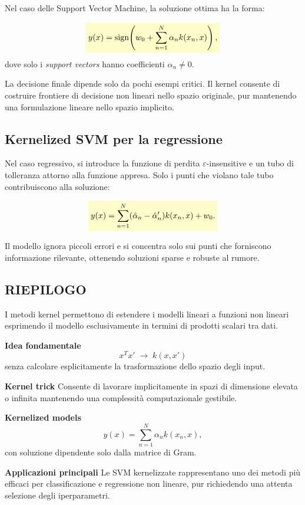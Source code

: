 \documentclass[a4paper,12pt]{report}
\newcommand{\highlight}[1]{%
\colorbox{yellow!20}{$\displaystyle #1$}%
}
\begin{document}
Nel caso delle Support Vector Machine, la soluzione ottima ha la forma:

\[
\highlight{
y(x) = \mathrm{sign}\!\left(w_0 + \sum_{n=1}^{N} \alpha_n k(x_n, x)\right),}
\]
dove solo i \emph{support vectors} hanno coefficienti $\alpha_n \neq 0$.

La decisione finale dipende solo da pochi esempi critici. Il kernel consente di costruire frontiere di decisione non lineari nello spazio originale, pur mantenendo una formulazione lineare nello spazio implicito.

\subsection{Kernelized SVM per la regressione}

Nel caso regressivo, si introduce la funzione di perdita $\varepsilon$-insensitive e un tubo di tolleranza attorno alla funzione appresa. Solo i punti che violano tale tubo contribuiscono alla soluzione:

\[
\highlight{
y(x) = \sum_{n=1}^{N} (\hat{\alpha}_n - \hat{\alpha}'_n) k(x_n, x) + w_0.}
\]

Il modello ignora piccoli errori e si concentra solo sui punti che forniscono informazione rilevante, ottenendo soluzioni sparse e robuste al rumore.

\subsection*{RIEPILOGO}

\begin{tcolorbox}[
    colback=green!10,
    colframe=green!50!black,
    title=\textbf{Kernel Methods -- Concetti chiave},
    fonttitle=\bfseries,
    sharp corners,
    boxrule=0.8pt
]

I metodi kernel permettono di estendere i modelli lineari a funzioni non lineari esprimendo il modello esclusivamente in termini di prodotti scalari tra dati.

\medskip
\textbf{Idea fondamentale}  
\[
x^T x' \;\rightarrow\; k(x,x')
\]
senza calcolare esplicitamente la trasformazione dello spazio degli input.

\medskip
\textbf{Kernel trick}  
Consente di lavorare implicitamente in spazi di dimensione elevata o infinita mantenendo una complessità computazionale gestibile.

\medskip
\textbf{Kernelized models}  
\[
y(x) = \sum_{n=1}^{N} \alpha_n k(x_n, x),
\]
con soluzione dipendente solo dalla matrice di Gram.

\medskip
\textbf{Applicazioni principali}  
Le SVM kernelizzate rappresentano uno dei metodi più efficaci per classificazione e regressione non lineare, pur richiedendo una attenta selezione degli iperparametri.

\end{tcolorbox}
\end{document}
